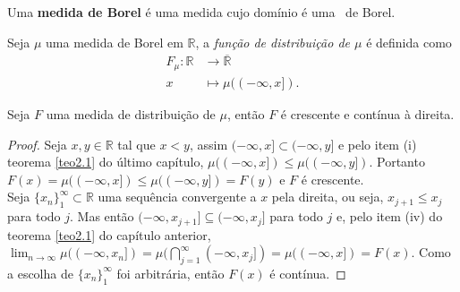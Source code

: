 
\begin{definicao}
    Uma \textbf{medida de Borel} é uma medida cujo domínio é uma \sig \ de Borel.
\end{definicao}


\begin{definicao}
    Seja $\mu$ uma medida de Borel em $\mathbb{R}$, a \textit{função de distribuição de $\mu$} é definida como 
    \begin{align*}
        F_{\mu}: \mathbb{R} & \longrightarrow \overline{\mathbb{R}} \\
                        x   & \mapsto \mu((-\infty,x]).
    \end{align*}
\end{definicao}

\begin{proposicao}
    Seja $F$ uma medida de distribuição de $\mu$, então $F$ é crescente e contínua à direita.
    \begin{proof}
        Seja $x,y \in \mathbb{R}$ tal que $x<y$, assim $(-\infty,x] \subset (-\infty,y]$ e pelo item (i) teorema \ref{teo2.1} do último capítulo, $\mu((-\infty,x])\leq \mu((-\infty,y])$. Portanto $F(x)=\mu((-\infty,x]) \leq \mu((-\infty,y])=F(y)$ e $F$ é crescente. \\
        Seja $\{x_n\}_1 ^\infty \subset \mathbb{R}$ uma sequência convergente a $x$ pela direita, ou seja, $ x_{j+1} \leq x_j $ para todo $j$. Mas então  $(-\infty,x_{j+1}] \subseteq (-\infty,x_{j}]$ para todo $j$ e, pelo item (iv) do teorema \ref{teo2.1} do capítulo anterior, $ \lim _{n \longrightarrow \infty} \mu((-\infty,x_n]) = \mu(\bigcap _{j=1} ^\infty (-\infty,x_j]) = \mu((-\infty,x])=F(x)$. Como a escolha de $\{x_n\}_1 ^\infty$ foi arbitrária, então $F(x)$ é contínua. 
    \end{proof}
\end{proposicao}

